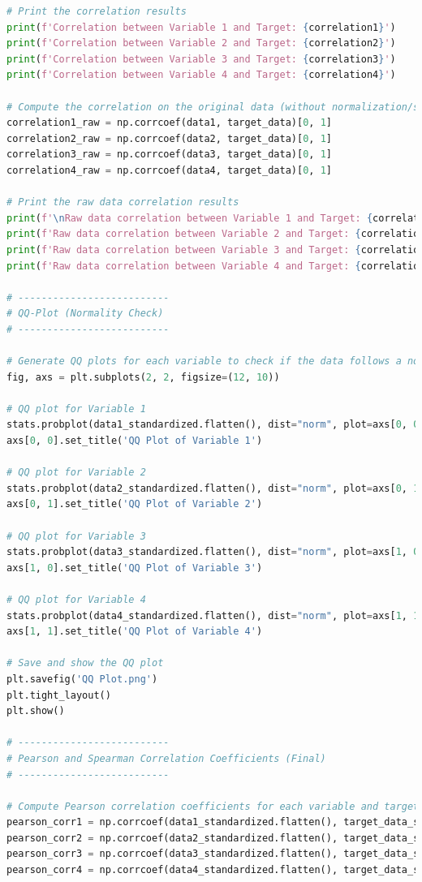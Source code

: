 \documentclass{swmcmthesis}
\begin{document}
\begin{lstlisting}[language=python,caption={The python programme for Problem 2}]
# Print the correlation results
print(f'Correlation between Variable 1 and Target: {correlation1}')
print(f'Correlation between Variable 2 and Target: {correlation2}')
print(f'Correlation between Variable 3 and Target: {correlation3}')
print(f'Correlation between Variable 4 and Target: {correlation4}')

# Compute the correlation on the original data (without normalization/standardization)
correlation1_raw = np.corrcoef(data1, target_data)[0, 1]
correlation2_raw = np.corrcoef(data2, target_data)[0, 1]
correlation3_raw = np.corrcoef(data3, target_data)[0, 1]
correlation4_raw = np.corrcoef(data4, target_data)[0, 1]

# Print the raw data correlation results
print(f'\nRaw data correlation between Variable 1 and Target: {correlation1_raw}')
print(f'Raw data correlation between Variable 2 and Target: {correlation2_raw}')
print(f'Raw data correlation between Variable 3 and Target: {correlation3_raw}')
print(f'Raw data correlation between Variable 4 and Target: {correlation4_raw}')

# --------------------------
# QQ-Plot (Normality Check)
# --------------------------

# Generate QQ plots for each variable to check if the data follows a normal distribution
fig, axs = plt.subplots(2, 2, figsize=(12, 10))

# QQ plot for Variable 1
stats.probplot(data1_standardized.flatten(), dist="norm", plot=axs[0, 0])
axs[0, 0].set_title('QQ Plot of Variable 1')

# QQ plot for Variable 2
stats.probplot(data2_standardized.flatten(), dist="norm", plot=axs[0, 1])
axs[0, 1].set_title('QQ Plot of Variable 2')

# QQ plot for Variable 3
stats.probplot(data3_standardized.flatten(), dist="norm", plot=axs[1, 0])
axs[1, 0].set_title('QQ Plot of Variable 3')

# QQ plot for Variable 4
stats.probplot(data4_standardized.flatten(), dist="norm", plot=axs[1, 1])
axs[1, 1].set_title('QQ Plot of Variable 4')

# Save and show the QQ plot
plt.savefig('QQ Plot.png')
plt.tight_layout()
plt.show()

# --------------------------
# Pearson and Spearman Correlation Coefficients (Final)
# --------------------------

# Compute Pearson correlation coefficients for each variable and target (after standardization)
pearson_corr1 = np.corrcoef(data1_standardized.flatten(), target_data_standardized.flatten())[0, 1]
pearson_corr2 = np.corrcoef(data2_standardized.flatten(), target_data_standardized.flatten())[0, 1]
pearson_corr3 = np.corrcoef(data3_standardized.flatten(), target_data_standardized.flatten())[0, 1]
pearson_corr4 = np.corrcoef(data4_standardized.flatten(), target_data_standardized.flatten())[0, 1]


\end{lstlisting}
\end{document}
